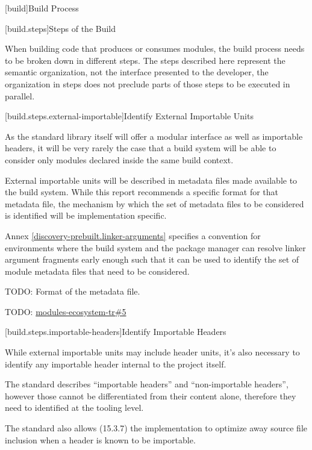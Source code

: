 
[build]{Build Process}

%

[build.steps]{Steps of the Build}

\pnum When building \Cpp{} code that produces or consumes modules, the
build process needs to be broken down in different steps. The steps
described here represent the semantic organization, not the interface
presented to the \Cpp{} developer, the organization in steps does not
preclude parts of those steps to be executed in parallel.

[build.steps.external-importable]{Identify External Importable Units}

\pnum As the \Cpp{} standard library itself will offer a modular
interface as well as importable headers, it will be very rarely the
case that a build system will be able to consider only modules
declared inside the same build context.

\pnum External importable units will be described in metadata files
made available to the build system. While this report recommends a
specific format for that metadata file, the mechanism by which the set
of metadata files to be considered is identified will be
implementation specific.

\pnum Annex \ref{discovery-prebuilt.linker-arguments} specifies a
convention for environments where the build system and the package
manager can resolve linker argument fragments early enough such that
it can be used to identify the set of module metadata files that need
to be considered.

\pnum TODO: Format of the metadata file.

\pnum TODO: \href{https://github.com/cplusplus/modules-ecosystem-tr/issues/5}{modules-ecosystem-tr\#5}

[build.steps.importable-headers]{Identify Importable Headers}

\pnum While external importable units may include header units, it's
also necessary to identify any importable header internal to the
project itself.

\pnum The \Cpp{} standard describes ``importable headers'' and
``non-importable headers'', however those cannot be differentiated
from their content alone, therefore they need to identified at the
tooling level.

\pnum The \Cpp{} standard also allows (15.3.7) the implementation to
optimize away source file inclusion when a header is known to be
importable.


